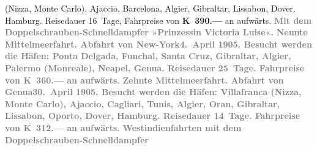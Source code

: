 \begin{ledgroupsized}[t]{13cm}
{{                     (Nizza, Monte Carlo), Ajaccio, Barcelona, Algier, Gibraltar, Lissabon, Dover, Hamburg. Reisedauer 16 Tage, Fahrpreise von \textbf{K 390.—} an aufwärts.}}\pend
           {\bigskip}\pstart
           \noindent{}\centering{}\textcolor{gray}{\textbf{Mit dem Doppelschrauben-Schnelldampfer »Prinzessin Victoria
                  Luise«.}}\pend
           \pstart
           \noindent{}\textcolor{gray}{\textbf{\textbf{Neunte Mittelmeerfahrt.}
                  Abfahrt von New-York\textbf{4. April 1905}. Besucht werden die Häfen: Ponta
                     Delgada, Funchal, Santa Cruz, Gibraltar, Algier, Palermo (Monreale),
                     Neapel, Genua. Reisedauer 25 Tage. Fahrpreise von \textbf{K 360.—} an
                  aufwärts.}}\pend
           \pstart
           \textcolor{gray}{\textbf{\textbf{Zehnte Mittelmeerfahrt.}
                  Abfahrt von Genua\textbf{30. April 1905}. Besucht werden die Häfen: Villafranca
                     (Nizza, Monte Carlo), Ajaccio, Cagliari, Tunis, Algier, Oran, Gibraltar, Lissabon, Oporto, Dover, Hamburg. Reisedauer 14 Tage. Fahrpreise von \textbf{K 312.—} an aufwärts.}}\pend
           {\bigskip}\pstart
           \noindent{}\centering{}\textcolor{gray}{\textbf{Westindienfahrten mit dem Doppelschrauben-Schnelldampfer
}}
\end{ledgroupsized}
